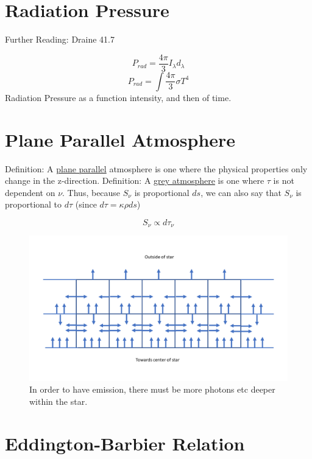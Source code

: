 \section{Radiation Pressure}

Further Reading: Draine 41.7 


\begin{equation}
    P_{rad} = \frac{4\pi}{3}I_{\lambda}d_{\lambda}
\end{equation}
\begin{equation}
    P_{rad} = \int \frac{4 \pi}{3} \sigma T^{4}
\end{equation}
Radiation Pressure as a function intensity, and then of time. 


\section{Plane Parallel Atmosphere}

Definition: A \underline{plane parallel} atmosphere is one where the physical properties only change in the z-direction.\newline
Definition: A \underline{grey atmosphere} is one where $\tau$ is not dependent on $\nu$. \newline
Thus, because $S_{\nu}$ is proportional $ds$, we can also say that $S_{\nu}$ is proportional to $d\tau$ (since $d\tau=\kappa\rho ds$)

\begin{equation}
    S_{\nu} \propto d\tau_{\nu}
\end{equation}

\begin{figure}[h]
    \centering
    \includegraphics[width=0.7\columnwidth]{radProc_parallel_gmm.png}
    \caption{In order to have emission, there must be more photons etc deeper within the star.}
\end{figure}


\section{Eddington-Barbier Relation}

